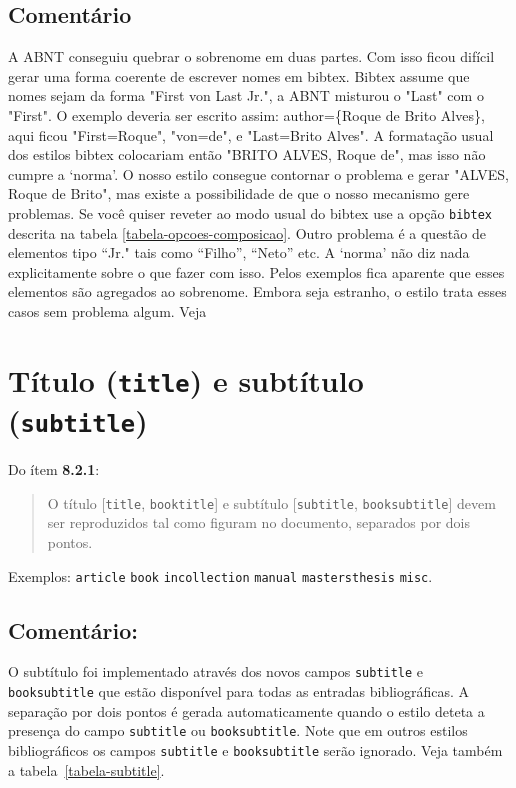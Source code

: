 \documentclass[espacosimples]{abnt}
\begin{document}
\subsection{Comentário}
A ABNT conseguiu quebrar o sobrenome em duas partes. Com isso ficou difícil
gerar uma forma coerente de escrever nomes em bibtex.
Bibtex assume que nomes sejam da forma "First von Last Jr.", a ABNT misturou
o "Last" com o "First". O exemplo  deveria ser
escrito assim: author=\{Roque de Brito Alves\}, aqui ficou "First=Roque",
"von=de",  e "Last=Brito Alves". A formatação usual dos 
estilos bibtex colocariam então "BRITO ALVES, Roque de",  mas isso não  cumpre
a `norma'. 
O nosso estilo consegue contornar o problema e gerar "ALVES, Roque de Brito",
mas existe a possibilidade de que o nosso mecanismo gere problemas.
Se você quiser reveter ao modo usual do bibtex use a opção
{\tt bibtex} descrita na tabela \ref{tabela-opcoes-composicao}.
Outro problema é a questão de elementos tipo ``Jr." tais como ``Filho'',
``Neto'' etc. A `norma' não diz nada explicitamente sobre o que fazer com isso.
Pelos exemplos fica aparente que esses elementos são agregados ao sobrenome.
Embora seja estranho, o estilo trata esses casos sem problema algum.
Veja 

\section{Título ({\tt title}) e subtítulo ({\tt subtitle})}

Do ítem {\bf 8.2.1}\cite{NBR6023:2000}:
\begin{quote}
O título [{\tt title}, {\tt booktitle}] e subtítulo [{\tt subtitle}, {\tt booksubtitle}] devem ser reproduzidos
tal como figuram no documento, separados por dois pontos.
\end{quote}

Exemplos:
{\tt article}\cite{7.4.2.3-2}
{\tt book}\cite{7.1.3-5,7.1.3-10,7.10-3,8.1.1.1-3,8.2.1,8.5.3}
{\tt incollection}\cite{7.2.2-1}
{\tt manual}\cite{NBR6023:2000,7.1.3-7,7.1.3-8,7.1.3-9,7.10-4,8.1.2.1-1}
{\tt mastersthesis}\cite{8.11.4-2}
{\tt misc}\cite{7.13.2-1}.

\subsection{Comentário:}
O subtítulo foi implementado através dos novos campos {\tt subtitle}
e {\tt booksubtitle} que
estão disponível para todas as entradas bibliográficas.
A separação por dois pontos é gerada automaticamente quando o estilo
deteta a presença do campo {\tt subtitle} ou {\tt booksubtitle}.
Note que em outros estilos bibliográficos os campos {\tt subtitle}
e {\tt booksubtitle} serão
ignorado.
Veja também a tabela~\ref{tabela-subtitle}.
\end{document}
